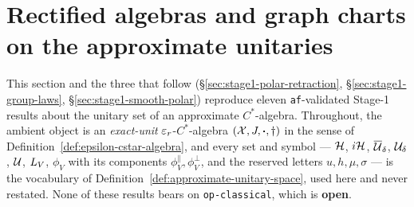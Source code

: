 \section{Rectified algebras and graph charts on the approximate unitaries}\label{sec:stage1-polar-charts}

This section and the three that follow (\S\ref{sec:stage1-polar-retraction},
\S\ref{sec:stage1-group-laws}, \S\ref{sec:stage1-smooth-polar}) reproduce eleven
\texttt{af}-validated Stage-1 results about the unitary set of an approximate
$C^*$-algebra. Throughout, the ambient object is an \emph{exact-unit}
$\varepsilon_r$-$C^*$-algebra $(\mathcal X,J,\mathbin{\bm{\cdot}},\dagger)$ in the sense of
Definition~\ref{def:epsilon-cstar-algebra}, and every set and symbol
--- $\mathcal H$, $i\mathcal H$, $\overline{\mathcal U}_{\delta}$, $\mathcal U_{\delta}$, $\mathcal U$, $L_{V}$, $\phi_V$
with its components $\phi_V^{\parallel},\phi_V^{\perp}$, and the reserved letters
$u,h,\mu,\sigma$ --- is the vocabulary of
Definition~\ref{def:approximate-unitary-space}, used here and never restated. None of
these results bears on \texttt{op-classical}, which is \textbf{open}.

